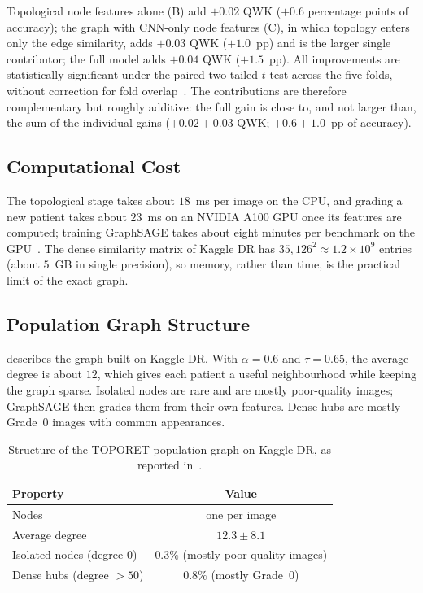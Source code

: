 Topological node features alone (B) add $+0.02$ QWK ($+0.6$ percentage points of accuracy);
the graph with CNN-only node features (C), in which topology enters only the edge
similarity, adds $+0.03$ QWK ($+1.0$~pp) and is the larger single contributor; the full model
adds $+0.04$ QWK ($+1.5$~pp). All improvements are statistically significant under the
paired two-tailed $t$-test across the five folds, without correction for fold overlap~\cite{belhadj2025plos}. The contributions are therefore complementary but roughly
additive: the full gain is close to, and not larger than, the sum of the individual gains
($+0.02+0.03$ QWK; $+0.6+1.0$~pp of accuracy).


\subsection{Computational Cost}
\label{sec:toporet-cost}

The topological stage takes about $18$~ms per image on the CPU, and grading a new patient
takes about $23$~ms on an NVIDIA A100 GPU once its features are computed; training GraphSAGE
takes about eight minutes per benchmark on the GPU~\cite{belhadj2025plos}. The dense
similarity matrix of Kaggle DR has $35{,}126^2\approx1.2\times10^{9}$ entries (about
$5$~GB in single precision), so memory, rather than time, is the practical limit of the
exact graph.

\subsection{Population Graph Structure}
\label{sec:graphstruct}

 describes the graph built on Kaggle DR. With
$\alpha=0.6$ and $\tau=0.65$, the average degree is about $12$, which gives each patient a
useful neighbourhood while keeping the graph sparse. Isolated nodes are rare and are
mostly poor-quality images; GraphSAGE then grades them from their own features. Dense hubs
are mostly Grade~0 images with common appearances.

\begin{table}[!htbp]
\centering
\caption[Structure of the TOPORET population graph]{Structure of the TOPORET population graph on Kaggle DR, as
reported in~\cite{belhadj2025plos}.}
\label{tab:graphstruct}
\small
\begin{tabular}{@{}lc@{}}
\toprule
Property & Value \\
\midrule
Nodes & one per image \\
Average degree & $12.3\pm8.1$ \\
Isolated nodes (degree $0$) & $0.3\%$ (mostly poor-quality images) \\
Dense hubs (degree $>50$) & $0.8\%$ (mostly Grade~0) \\
\bottomrule
\end{tabular}
\end{table}

